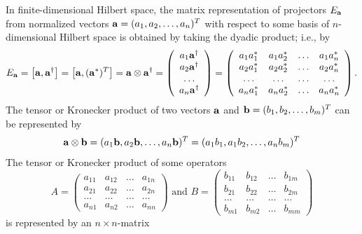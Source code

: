 \documentclass[pra,amsfonts,showpacs,showkeys,preprint]{revtex4}
\begin{document}
In finite-dimensional Hilbert space, the matrix representation of projectors $E_{\bf a}$
from normalized vectors ${\bf a}=(a_1,a_2,\ldots ,a_n)^T$ with respect to some basis of $n$-dimensional Hilbert space
is obtained by taking the dyadic product; i.e., by
\begin{equation}
E_{\bf a}= \left[{\bf a},{\bf a}^\dagger\right]=\left[{\bf a},({\bf a}^\ast)^T\right]=
{\bf a}\otimes {\bf a}^\dagger =
\left(
\begin{array}{cccccccccc}
a_1{\bf a}^\dagger \\
a_2{\bf a}^\dagger \\
\ldots  \\
a_n{\bf a}^\dagger
\end{array}
\right)
=
\left(
\begin{array}{cccccccccc}
a_1a_1^\ast & a_1a_2^\ast & \ldots & a_1a_n^\ast \\
a_2a_1^\ast & a_2a_2^\ast & \ldots & a_2a_n^\ast \\
\ldots & \ldots & \ldots & \ldots \\
a_na_1^\ast & a_na_2^\ast & \ldots & a_na_n^\ast
\end{array}
\right)
.
\end{equation}
The tensor or Kronecker product of two vectors ${\bf a}$ and ${\bf b} =(b_1,b_2,\ldots ,b_m)^T$ can be represented by
\begin{equation}
{\bf a} \otimes {\bf b} = (a_1{\bf b},a_2{\bf b},\ldots ,a_n{\bf b})^T = (a_1b_1,a_1b_2,\ldots ,a_nb_m)^T
\end{equation}
The tensor or Kronecker product of some operators
\begin{equation}
A=
\left(
\begin{array}{cccccccccc}
a_{11} & a_{12} & \ldots & a_{1n} \\
a_{21} & a_{22} & \ldots & a_{2n} \\
\ldots & \ldots & \ldots & \ldots \\
a_{n1} & a_{n2} & \ldots & a_{nn}
\end{array}
\right)
\text{ and  }B=
\left(
\begin{array}{cccccccccc}
b_{11} & b_{12} & \ldots & b_{1m} \\
b_{21} & b_{22} & \ldots & b_{2m} \\
\ldots & \ldots & \ldots & \ldots \\
b_{m1} & b_{m2} & \ldots & b_{mm}
\end{array}
\right)
\end{equation}
is represented by an $n\times n$-matrix
\end{document}

